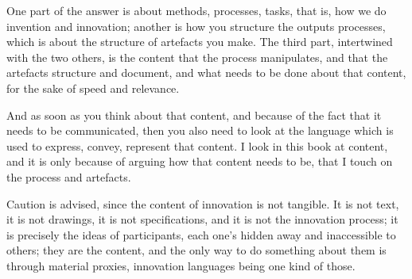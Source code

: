 One part of the answer is about methods, processes, tasks, that is, how we do invention and innovation; another is how you structure the outputs processes, which is about the structure of artefacts you make. The third part, intertwined with the two others, is the content that the process manipulates, and that the artefacts structure and document, and what needs to be done about that content, for the sake of speed and relevance. 

And as soon as you think about that content, and because of the fact that it needs to be communicated, then you also need to look at the language which is used to express, convey, represent that content. I look in this book at content, and it is only because of arguing how that content needs to be, that I touch on the process and artefacts. 

Caution is advised, since the content of innovation is not tangible. It is not text, it is not drawings, it is not specifications, and it is not the innovation process; it is precisely the ideas of participants, each one's hidden away and inaccessible to others; they are the content, and the only way to do something about them is through material proxies, innovation languages being one kind of those.


\printbibliography